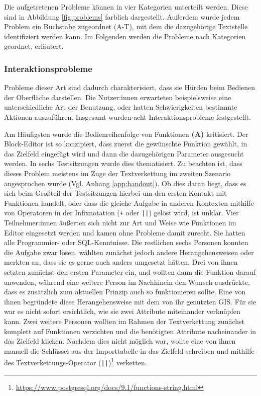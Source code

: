 Die aufgetretenen Probleme können in vier Kategorien unterteilt werden. Diese sind in Abbildung \ref{fig:problems} farblich dargestellt. Außerdem wurde jedem Problem ein Buchstabe zugeordnet (A-T), mit dem die dazugehörige Textstelle identifiziert werden kann. Im Folgenden werden die Probleme nach Kategorien geordnet, erläutert.

\subsubsection{Interaktionsprobleme}

Probleme dieser Art sind dadurch charakterisiert, dass sie Hürden beim Bedienen der Oberfläche darstellen. Die Nutzer:innen erwarteten beispielsweise eine unterschiedliche Art der Benutzung, oder hatten Schwierigkeiten bestimmte Aktionen auszuführen. Insgesamt wurden acht Interaktionsprobleme festgestellt.

Am Häufigsten wurde die Bedienreihenfolge von Funktionen \textbf{(A)} kritisiert. Der Block-Editor ist so konzipiert, dass zuerst die gewünschte Funktion gewählt, in das Zielfeld eingefügt wird und dann die dazugehörigen Parameter ausgesucht werden. In sechs Testsitzungen wurde dies thematisiert. Zu beachten ist, dass dieses Problem meistens im Zuge der Textverkettung im zweiten Szenario angesprochen wurde (Vgl. Anhang \ref{app:handout}). Ob dies daran liegt, dass es sich beim Großteil der Testsitzungen hierbei um den ersten Kontakt mit Funktionen handelt, oder dass die gleiche Aufgabe in anderen Kontexten mithilfe von Operatoren in der Infixnotation (\texttt{+} oder \texttt{||}) gelöst wird, ist unklar. Vier Teilnehmer:innen äußerten sich nicht zur Art und Weise wie Funktionen im Editor eingesetzt werden und kamen ohne Probleme damit zurecht. Sie hatten alle Programmier- oder \ac{SQL}-Kenntnisse. Die restlichen sechs Personen konnten die Aufgabe zwar lösen, wählten zunächst jedoch andere Herangehensweisen oder merkten an, dass sie es gerne auch anders umgesetzt hätten. Drei von ihnen setzten zunächst den ersten Parameter ein, und wollten dann die Funktion darauf anwenden, während eine weitere Person im Nachhinein den Wunsch ausdrückte, dass es zusätzlich zum aktuellen Prinzip auch so funktionieren sollte. Eine von ihnen begründete diese Herangehensweise mit dem von ihr genutzten \ac{GIS}. Für sie war es nicht sofort ersichtlich, wie sie zwei Attribute miteinander verknüpfen kann. Zwei weitere Personen wollten im Rahmen der Textverkettung zunächst komplett auf Funktionen verzichten und die benötigten Attribute nacheinander in das Zielfeld klicken. Nachdem dies nicht möglich war, wollte eine von ihnen manuell die Schlüssel aus der Importtabelle in das Zielfeld schreiben und mithilfe des Textverkettungs-Operator (\texttt{||})\footnote{\url{https://www.postgresql.org/docs/9.1/functions-string.html}} verketten.

